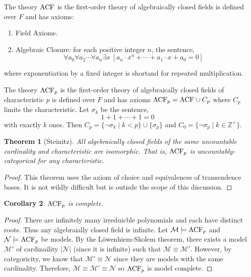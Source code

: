 \documentclass[12pt]{article}
\newcommand{\Zplus}{\mathbb{Z}^{+}}
\newcommand{\entails}{\models}
\newcommand{\Mmod}{\mathcal{M}}
\newcommand{\Nmod}{\mathcal{N}}
\newenvironment{definition}[1][Definition:]{\begin{trivlist}
\item[\hskip \labelsep {\bfseries #1}]}{\end{trivlist}}
\theoremstyle{theorem}
\newtheorem{theorem}{Theorem}[section]
\newtheorem{corollary}[theorem]{Corollary}
\theoremstyle{definition}
\theoremstyle{definition}
\theoremstyle{remark}
\theoremstyle{definition}
\theoremstyle{remark}
\begin{document}
\begin{definition}
The theory $\mathrm{ACF}_{}$ is the first-order theory of algebraically closed fields is defined over $F$ and has axioms:
\begin{enumerate}
\item Field Axioms.
\item Algebraic Closure: for each positive integer $n$, the sentence,
\[ \forall a_0 \forall a_2 \cdots \forall a_n \exists x \: \left[ a_n \cdot x^n + \cdots + a_1 \cdot x + a_0 = 0 \right] \]
\end{enumerate}
where exponentiation by a fixed integer is shortand for repeated multiplication. 
\end{definition}

\begin{definition}
The theory $\mathrm{ACF}_{p}$ is the first-order theory of algebraically closed fields of characteristic $p$ is defined over $F$ and has axioms $\mathrm{ACF}_{p} = \mathrm{ACF}_{} \cup C_p$ where $C_p$ limits the characteristic. Let $\sigma_k$ be the sentence,
\[ 1 + 1 + \cdots + 1 = 0 \]
with exactly $k$ ones. Then $C_p = \{ \neg \sigma_k \mid k < p \} \cup \{ \sigma_p \}$ and $C_0 = \{ \neg \sigma_p \mid k \in \Zplus \}$.  
\end{definition}

\begin{theorem}[Steinitz]
All algebraically closed fields of the same uncountable cardinality and characteristic are isomorphic. That is, $\mathrm{ACF}_{p}$ is uncountably-categorical for any characteristic.
\end{theorem}

\begin{proof}
This theorem uses the axiom of choice and equivalences of transendence bases. It is not wildly difficult but is outisde the scope of this discussion.
\end{proof}


\begin{corollary}
$\mathrm{ACF}_{p}$ is complete.
\end{corollary}

\begin{proof}
There are infinitely many irreduicble polynomials and each have distinct roots. Thus any algebraially closed field is infinite. Let $ \Mmod \entails \ACF{p}$ and $\Nmod \entails \ACF{p}$ be models. By the L\"{o}wenhiem-Skolem theorem, there exists a model $\Mmod'$ of cardinaility $|\Nmod|$ (since it is infinite) such that $\Mmod \equiv \Mmod'$. However, by categoricity, we know that $\Mmod' \cong \Nmod$ since they are models with the same cardinality. Therefore, $\Mmod \equiv \Mmod' \equiv \Nmod$ so $\mathrm{ACF}_{p}$ is model complete.  
\end{proof}
\end{document}
